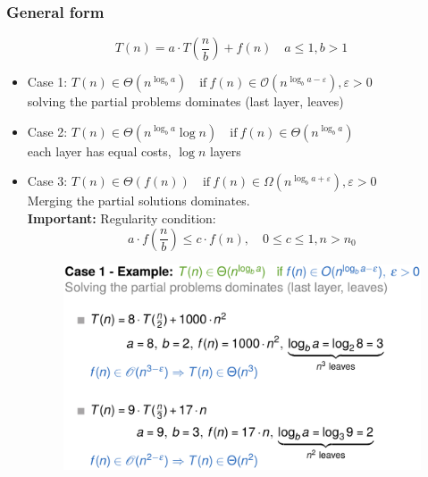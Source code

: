 \documentclass[12pt, a4paper]{scrartcl}
\newcommand{\bigO}{\mathcal{O}}
\newcommand{\imgwidth}{.7\textwidth}
\begin{document}
\subsubsection{General form}
\label{sec:master_general}
\begin{equation}
  \label{eq:master_theorem_general}
  T(n)=a\cdot T\left( \frac{n}{b} \right)+f(n)\quad a\le1,b>1
\end{equation}
\begin{itemize}
\item Case 1: $T(n)\in\Theta(n^{\log_b a})\quad \mathrm{if\ } f(n)\in\bigO(n^{\log_b a-\varepsilon}), \varepsilon>0$\\
  solving the partial problems dominates (last layer, leaves)
\item Case 2: $T(n)\in\Theta(n^{\log_b a}\log n)\quad \mathrm{if\ } f(n)\in\Theta(n^{\log_b a})$\\
  each layer has equal costs, $\log n$ layers
\item Case 3: $T(n)\in\Theta(f(n))\quad \mathrm{if\ }f(n)\in\Omega(n^{\log_b a+\varepsilon}), \varepsilon>0$\\
  Merging the partial solutions dominates.\\
  \textbf{Important:} Regularity condition:
  \begin{equation}
    \label{eq:regularity_condition}
    a\cdot f\left( \frac{n}{b} \right)\le c\cdot f(n),\quad 0\le c\le 1, n>n_0
  \end{equation}
\begin{figure}[htbp]
  \centering
  \includegraphics[width=\imgwidth]{master_theorem_ex1}
\end{figure}
\begin{figure}[htbp]
  \centering

\end{figure}
\end{itemize}
\end{document}
